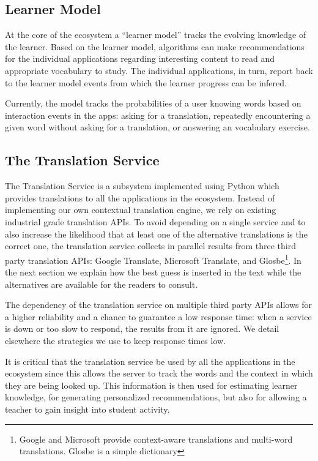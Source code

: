 \subsection{Learner Model}

At the core of the ecosystem a ``learner model'' tracks the evolving knowledge of the learner. 
Based on the learner model, algorithms can make recommendations for the individual applications regarding interesting content to read and appropriate vocabulary to study. The individual applications, in turn, report back to the learner model events from which the learner progress can be infered. 

Currently, the model tracks the probabilities of a user knowing words based on interaction events in the apps: asking for a translation, repeatedly encountering a given word without asking for a translation, or answering an vocabulary exercise.


\subsection{The Translation Service}

The Translation Service is a subsystem implemented using Python which provides translations to all the applications in the ecosystem. Instead of implementing our own contextual translation engine, we rely on existing industrial grade translation APIs. To avoid depending on a single service and to also increase the likelihood that at least one of the alternative translations is the correct one, the translation service collects in parallel results from three third party translation APIs: Google Translate, Microsoft Translate, and Glosbe\footnote{Google and Microsoft provide context-aware translations and multi-word translations. Glosbe is a simple dictionary}. \cite{Jager17-mux} In the next section we explain how the best guess is inserted in the text while the alternatives are available for the readers to consult.

The dependency of the translation service on multiple third party APIs allows for a higher reliability and a chance to guarantee a low response time: when a service is down or too slow to respond, the results from it are ignored. We detail elsewhere the strategies we use to keep response times low\cite{Jager17-mux}.

It is critical that the translation service be used by all the applications in the ecosystem since this allows the server to track the words and the context in which they are being looked up. This information is then used for estimating learner knowledge, for generating personalized recommendations, but also for allowing a teacher to gain insight into student activity.


